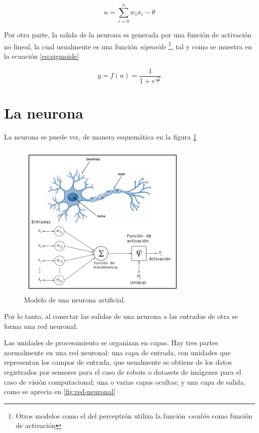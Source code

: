 \documentclass[a4paper,12pt,twocolumn]{article}
\begin{document}
  \begin{equation}
    u = \sum_{i = 0}^{n} w_ix_i - \theta \label{eq:umbral}
  \end{equation}

  Por otra parte, la salida de la neurona es generada por una función de
  activación no lineal, la cual usualmente es una función \textit{sigmoide}
  \footnote{Otros modelos como el del perceptrón utiliza la función
  \textit{escalón} como función de activación}, tal y como se muestra en la
  ecuación \ref{eq:sigmoide}

  \begin{equation}
    y = f(u) = \dfrac{1}{1+e^{\frac{-u}{T}}}\label{eq:sigmoide}
  \end{equation}

  \section{La neurona}

  La neurona se puede ver, de manera esquemática en la figura \ref{fig:neurona}

  \begin{figure}[ht!]
    \centering
    \includegraphics[width=0.6\linewidth]{neurona}
    \caption[Modelo de neurona artificial]{Modelo de una neurona artificial.}
    \label{fig:neurona}
  \end{figure}

  Por lo tanto, al conectar las salidas de una neurona a las entradas de otra se
  forma una red neuronal.

  Las unidades de procesamiento se organizan en capas. Hay tres partes
  normalmente en una red neuronal: una capa de entrada, con unidades que
  representan los campos de entrada, que usualmente se obtiene de los datos
  registrados por sensores para el caso de robots o datasets de imágenes para el
  caso de visión computacional; una o varias capas ocultas; y una capa de
  salida, como se aprecia en \ref{fig:red-neuronal}
\end{document}
